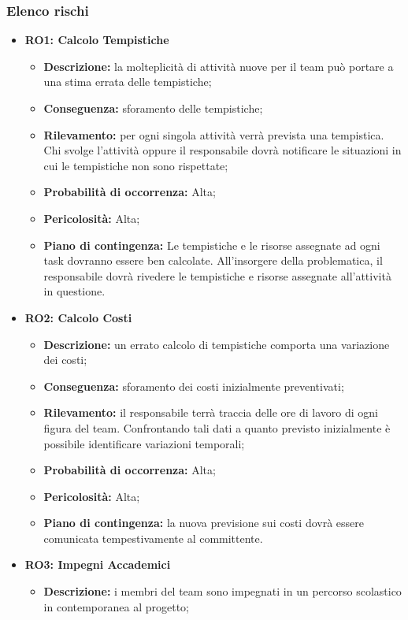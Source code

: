 \subsubsection{Elenco rischi}
\begin{itemize}
	\item \textbf{RO1: Calcolo Tempistiche}
	\begin{itemize}
		\item \textbf{Descrizione:} la molteplicità di attività nuove per il team può portare a una stima errata delle tempistiche;
		\item \textbf{Conseguenza:} sforamento delle tempistiche;
		\item \textbf{Rilevamento:} per ogni singola attività verrà prevista una tempistica. Chi svolge l'attività oppure il responsabile dovrà notificare le situazioni in cui le tempistiche non sono rispettate;
		\item \textbf{Probabilità di occorrenza:} Alta;
		\item \textbf{Pericolosità:} Alta;
		\item \textbf{Piano di contingenza:} Le tempistiche e le risorse assegnate ad ogni task dovranno essere ben calcolate. All'insorgere della problematica, il responsabile dovrà rivedere le tempistiche e risorse assegnate all'attività in questione.
	\end{itemize}
	\item \textbf{RO2: Calcolo Costi}
	\begin{itemize}
		\item \textbf{Descrizione:} un errato calcolo di tempistiche comporta una variazione dei costi;
		\item \textbf{Conseguenza:} sforamento dei costi inizialmente preventivati;
		\item \textbf{Rilevamento:} il responsabile terrà traccia delle ore di lavoro di ogni figura del team. Confrontando tali dati a quanto previsto inizialmente è possibile identificare variazioni temporali;
		\item \textbf{Probabilità di occorrenza:} Alta;
		\item \textbf{Pericolosità:} Alta;
		\item \textbf{Piano di contingenza:} la nuova previsione sui costi dovrà essere comunicata tempestivamente al committente.
	\end{itemize}
	\item \textbf{RO3: Impegni Accademici}
	\begin{itemize}
		\item \textbf{Descrizione:} i membri del team sono impegnati in un percorso scolastico in contemporanea al progetto;

\end{itemize}
\end{itemize}
